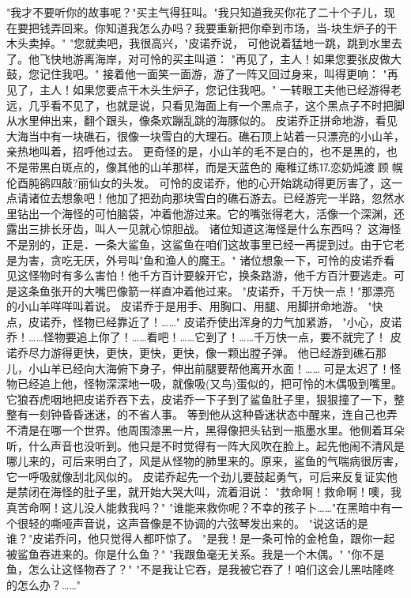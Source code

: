\documentclass[12pt,UTF8]{ctexbook}
\begin{document}
"我才不要听你的故事呢？"买主气得狂叫。"我只知道我买你花了二十个子儿，现在要把钱弄回来。你知道我怎么办吗？我要重新把你牵到市场，当-块生炉子的干木头卖掉。"
"您就卖吧，我很高兴，"皮诺乔说，
可他说着猛地一跳，跳到水里去了。他飞快地游离海岸，对可怜的买主叫道：
"再见了，主人！如果您要张皮做大鼓，您记住我吧。"
接着他一面笑一面游，游了一阵又回过身来，叫得更响：
"再见了，主人！如果您要点干木头生炉子，您记住我吧。"
一转眼工夫他已经游得老远，几乎看不见了，也就是说，只看见海面上有一个黑点子，这个黑点子不时把脚从水里伸出来，翻个跟头，像条欢蹦乱跳的海豚似的。
皮诺乔正拼命地游，看见大海当中有一块礁石，很像一块雪白的大理石。礁石顶上站着一只漂亮的小山羊，亲热地叫着，招呼他过去。
更奇怪的是，小山羊的毛不是白的，也不是黑的，也不是带黑白斑点的，像其他的山羊那样，而是天蓝色的庵稚辽练⒘恋奶炖渡顾幌伦酉肫鹆四敲?丽仙女的头发。
可怜的皮诺乔，他的心开始跳动得更厉害了，这一点请诸位去想象吧！他加了把劲向那块雪白的礁石游去。已经游完一半路，忽然水里钻出一个海怪的可怕脑袋，冲着他游过来。它的嘴张得老大，活像一个深渊，还露出三排长牙齿，叫人一见就心惊胆战。
诸位知道这海怪是什么东西吗？
这海怪不是别的，正是．一条大鲨鱼，这鲨鱼在咱们这故事里已经一再提到过。由于它老是为害，贪吃无厌，外号叫"鱼和渔人的魔王。"
诸位想象一下，可怜的皮诺乔看见这怪物时有多么害怕！他千方百计要躲开它，换条路游，他千方百汁要逃走。可是这条鱼张开的大嘴巴像箭一样直冲着他过来。
"皮诺乔，千万快一点！"那漂亮的小山羊咩咩叫着说。
皮诺乔于是用手、用胸口、用腿、用脚拼命地游。
"快点，皮诺乔，怪物已经靠近了！……"
皮诺乔使出浑身的力气加紧游，
"小心，皮诺乔！……怪物要追上你了！……看吧！……它到了！……千万快一点，要不就完了！
皮诺乔尽力游得更快，更快，更快，更快，像一颗出膛子弹。
他已经游到礁石那儿，小山羊已经向大海俯下身子，伸出前腿要帮他离开水面！……
可是太迟了！怪物已经追上他，怪物深深地一吸，就像吸(又鸟)蛋似的，把可怜的木偶吸到嘴里。它狼吞虎咽地把皮诺乔吞下去，皮诺乔一下子到了鲨鱼肚子里，狠狠撞了一下，整整有一刻钟昏昏迷迷，的不省人事。
等到他从这种昏迷状态中醒来，连自己也弄不清是在哪一个世界。他周围漆黑一片，黑得像把头钻到一瓶墨水里。他侧着耳朵听，什么声音也没听到。他只是不时觉得有一阵大风吹在脸上。起先他闹不清风是哪儿来的，可后来明白了，风是从怪物的肺里来的。原来，鲨鱼的气喘病很厉害，它一呼吸就像刮北风似的。
皮诺乔起先一个劲儿要鼓起勇气，可后来反复证实他是禁闭在海怪的肚子里，就开始大哭大叫，流着泪说：
"救命啊！救命啊！噢，我真苦命啊！这儿没人能救我吗？"
"谁能来救你呢？不幸的孩子卜……"在黑暗中有一个很轻的嘶哑声音说，这声音像是不协调的六弦琴发出来的。
"说这话的是谁？"皮诺乔问，他只觉得人都吓惊了。
"是我！是一条可怜的金枪鱼，跟你一起被鲨鱼吞进来的。你是什么鱼？"
"我跟鱼毫无关系。我是一个木偶。"
"你不是鱼，怎么让这怪物吞了？"
"不是我让它吞，是我被它吞了！咱们这会儿黑咕隆咚的怎么办？……"
\end{document}
